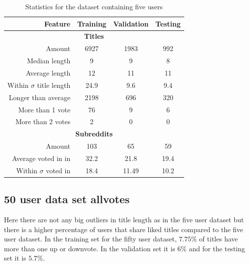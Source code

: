 \begin{table}[H]
    \centering
    \begin{tabular}{ r | c | c | c }
    \hline
    \textbf{Feature} & \textbf{Training} & \textbf{Validation} & \textbf{Testing} \\ \hline \hline
    \multicolumn{4}{c}{\textbf{Titles}} \\ \hline \hline
    Amount & 6927 & 1983 & 992 \\ \hline
    Median length & 9 & 9 & 8 \\ \hline
    Average length & 12 & 11 & 11  \\ \hline
    Within $\sigma$ title length & 24.9 & 9.6 & 9.4 \\ \hline
    Longer than average & 2198 & 696 & 320 \\ \hline
    More than 1 vote & 76 & 9 & 6 \\ \hline
    More than 2 votes & 2 & 0 & 0\\ \hline \hline
    \multicolumn{4}{c}{\textbf{Subreddits}} \\ \hline \hline
    Amount & 103 & 65 & 59  \\ \hline
    Average voted in in & 32.2 & 21.8 & 19.4 \\ \hline
    Within $\sigma$ voted in & 18.4 & 11.49 & 10.2  \\ \hline
    \end{tabular}
    \caption{Statistics for the dataset containing five users}
    \label{table:5-user-set-train}
\end{table}
\subsection{50 user data set allvotes}
Here there are not any big outliers in title length as in the five user dataset but there is a higher percentage of users that share liked titles compared to the five user dataset. In the training set for the fifty user dataset, $7.75\%$ of titles have more than one up or downvote. In the validation set it is $6\%$ and for the testing set it is $5.7\%$.


